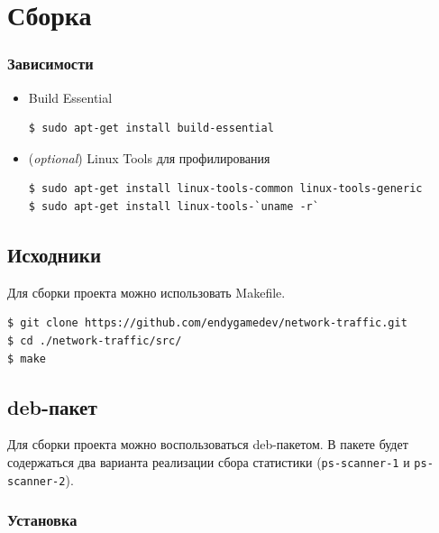 \section{Сборка}


\subsubsection*{Зависимости}

\begin{itemize}
\item Build Essential
\begin{lstlisting}[language=bash]
$ sudo apt-get install build-essential
\end{lstlisting}

\item (\textit{optional}) Linux Tools для профилирования
\begin{lstlisting}
$ sudo apt-get install linux-tools-common linux-tools-generic
$ sudo apt-get install linux-tools-`uname -r`
\end{lstlisting}
\end{itemize}


\subsection{Исходники}

Для сборки проекта можно использовать Makefile.
\begin{lstlisting}
$ git clone https://github.com/endygamedev/network-traffic.git
$ cd ./network-traffic/src/
$ make
\end{lstlisting}


\subsection{deb-пакет}

Для сборки проекта можно воспользоваться deb-пакетом. В пакете будет содержаться два варианта реализации сбора статистики (\verb|ps-scanner-1| и \verb|ps-scanner-2|).

\subsubsection*{Установка}

